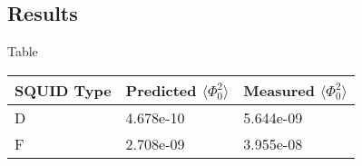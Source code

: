 \subsection{Results}
Table 


\begin{table}[H]
    \begin{tabular}{lll}
    \hline
    SQUID Type & Predicted $\langle \Phi_0 ^2 \rangle$ & Measured $\langle \Phi_0 ^2 \rangle$ \\ \hline
    D          & 4.678e-10                         & 5.644e-09            \\
    F          & 2.708e-09                         & 3.955e-08            \\ \hline
    \end{tabular}
\end{table}
